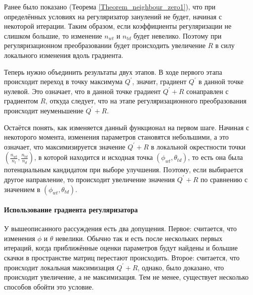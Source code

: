 \documentclass[12pt, twoside]{article}
\begin{document}
Ранее было показано (Теорема \ref{Theorem_neighbour_zero1}), что при определённых условиях на регуляризатор занулений не будет, начиная с некоторой итерации. Таким образом, если коэффициенты регуляризации не слишком большие, то изменение $n_{wt}$ и $n_{td}$ будет невелико. Поэтому при регуляризационном преобразовании будет происходить увеличение $R$ в силу локального изменения вдоль градиента.

Теперь нужно объединить результаты двух этапов. В ходе первого этапа происходит переход в точку максимума $Q^{\prime}$, значит, градиент $Q^{\prime}$ в данной точке нулевой. Это означает, что в данной точке градиент $Q^{\prime} +  R$ сонаправлен с градиентом $R$, откуда следует, что на этапе регуляризационного преобразования происходит неуменьшение $Q^{\prime} +  R$. 

Остаётся понять, как изменяется данный функционал на первом шаге. Начиная с некоторого момента, изменения параметров становятся небольшими, а это означает, что максимизируется значение $Q^{\prime} +  R$ в локальной окрестности точки $\left(\frac{n_{wt}}{n_t}, \frac{n_{td}}{n_d}\right)$, в которой находится и исходная точка $(\phi_{wt}, \theta_{td})$, то есть она была потенциальным кандидатом при выборе улучшения. Поэтому, если выбирается другое направление, то происходит увеличение значения $Q^{\prime} + R$ по сравнению с значением в $(\phi_{wt}, \theta_{td})$.

\paragraph{Использование градиента регуляризатора}
\label{subsec:gradientuse}
У вышеописанного рассуждения есть два допущения. Первое: считается, что изменения $\phi$ и $\theta$ невелики. Обычно так и есть после нескольких первых итераций, когда приближённые оценки параметров будут найдены и большие скачки в пространстве матриц перестают происходить. Второе: считается, что происходит локальная максимизация $Q^{\prime} + R$, однако, было доказано, что происходит увеличение, а не максимизация. Тем не менее, существует несколько способов обойти это условие. 
\end{document}
